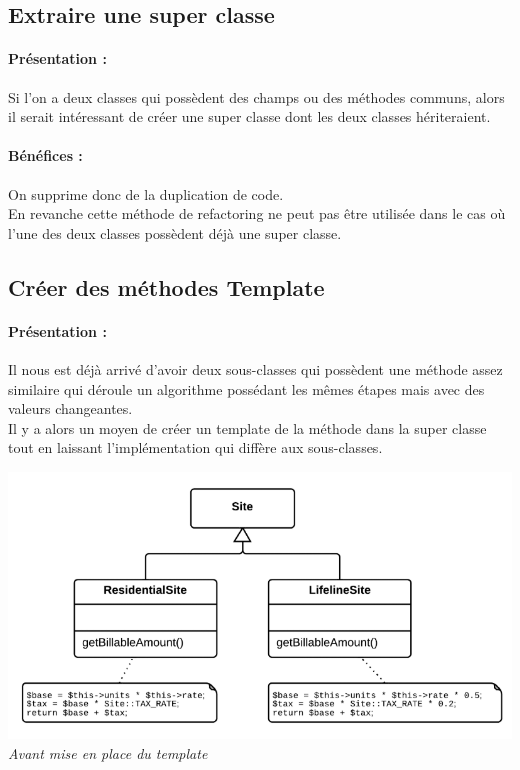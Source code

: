 \documentclass[a4paper,twoside,12pt,openright]{report}
\begin{document}
\subsection{Extraire une super classe}
\paragraph{Présentation :}
Si l'on a deux classes qui possèdent des champs ou des méthodes communs, alors il serait intéressant de créer une super classe dont les deux classes hériteraient.\\

\paragraph{Bénéfices :}
On supprime donc de la duplication de code.\\
En revanche cette méthode de refactoring ne peut pas être utilisée dans le cas où l'une des deux classes possèdent déjà une super classe.\\

\subsection{Créer des méthodes Template}
\paragraph{Présentation :}
Il nous est déjà arrivé d'avoir deux sous-classes qui possèdent une méthode assez similaire qui déroule un algorithme possédant les mêmes étapes mais avec des valeurs changeantes.\\
Il y a alors un moyen de créer un template de la méthode dans la super classe tout en laissant l'implémentation qui diffère aux sous-classes.\\

\begin{center}
\includegraphics[scale=0.75]{Image/Template.png}\\
\itshape{Avant mise en place du template \cite{ref5}}
\end{center}
\end{document}
